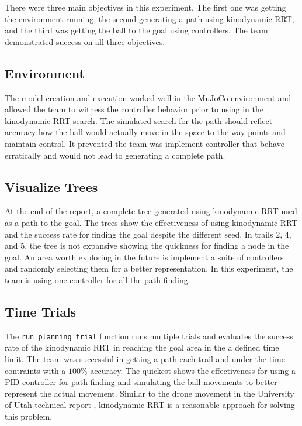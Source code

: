 \documentclass[12pt]{article}
\begin{document}
There were three main objectives in this experiment. The first one was getting the environment running, the second generating a path using kinodynamic RRT, and the third was getting the ball to the goal using controllers. The team demonstrated success on all three objectives. 

\subsection{Environment}

The model creation and execution worked well in the MuJoCo environment and allowed the team to witness the controller behavior prior to using in the kinodynamic RRT search. The simulated search for the path should reflect accuracy how the ball would actually move in the space to the way points and maintain control. It prevented the team was implement controller that behave erratically and would not lead to generating a complete path.

\subsection{Visualize Trees}

At the end of the report, a complete tree generated using kinodynamic RRT used as a path to the goal. The trees show the effectiveness of using kinodynamic RRT and the success rate for finding the goal despite the different seed. In trails 2, 4, and 5, the tree is not expansive showing the quickness for finding a node in the goal. An area worth exploring in the future is implement a suite of controllers and randomly selecting them for a better representation. In this experiment, the team is using one controller for all the path finding. 

\subsection{Time Trials}

The \texttt{run\_planning\_trial} function runs multiple trials and evaluates the success rate of the kinodynamic RRT in reaching the goal area in the a defined time limit. The team was successful in getting a path each trail and under the time contraints with a $100\%$ accuracy. The quickest shows the effectiveness for using a PID controller for path finding and simulating the ball movements to better represent the actual movement. Similar to the drone movement in the University of Utah technical report \cite{uucs_12_002}, kinodynamic RRT is a reasonable approach for solving this problem. 
\end{document}
